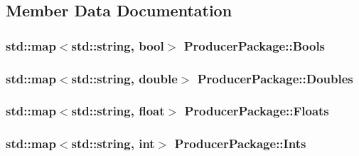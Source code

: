 \subsection{Member Data Documentation}
\hypertarget{class_producer_package_a469d2ff5c8995155c4ea3047e000e031}{
\subsubsection[{Bools}]{\setlength{\rightskip}{0pt plus 5cm}std\-::map$<$std\-::string, bool$>$ Producer\-Package\-::\-Bools\hspace{0.3cm}{\ttfamily [private]}}}\label{class_producer_package_a469d2ff5c8995155c4ea3047e000e031}
\hypertarget{class_producer_package_a39d4f108a360af494d93a62b2fab66e8}{
\subsubsection[{Doubles}]{\setlength{\rightskip}{0pt plus 5cm}std\-::map$<$std\-::string, double$>$ Producer\-Package\-::\-Doubles\hspace{0.3cm}{\ttfamily [private]}}}\label{class_producer_package_a39d4f108a360af494d93a62b2fab66e8}
\hypertarget{class_producer_package_a255443b4b56e2b9e5d012d567f08ab1a}{
\subsubsection[{Floats}]{\setlength{\rightskip}{0pt plus 5cm}std\-::map$<$std\-::string, float$>$ Producer\-Package\-::\-Floats\hspace{0.3cm}{\ttfamily [private]}}}\label{class_producer_package_a255443b4b56e2b9e5d012d567f08ab1a}
\hypertarget{class_producer_package_a9e9986063d53046485a3ec1faac95426}{
\subsubsection[{Ints}]{\setlength{\rightskip}{0pt plus 5cm}std\-::map$<$std\-::string, int$>$ Producer\-Package\-::\-Ints\hspace{0.3cm}{\ttfamily [private]}}}\label{class_producer_package_a9e9986063d53046485a3ec1faac95426}
